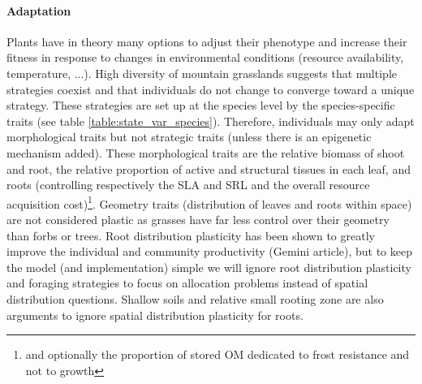 \paragraph{Adaptation} Plants have in theory many options to adjust their phenotype and increase their fitness in response to changes in environmental conditions (resource availability, temperature, ...). High diversity of mountain grasslands suggests that multiple strategies coexist and that individuals do not change to converge toward a unique strategy. These strategies are set up at the species level by the species-specific traits (see table \ref{table:state_var_species}). Therefore, individuals may only adapt morphological traits but not strategic traits (unless there is an epigenetic mechanism added). These morphological traits are the relative biomass of shoot and root, the relative proportion of active and structural tissues in each leaf, and roots (controlling respectively the SLA and SRL and the overall resource acquisition cost)\footnote{and optionally the proportion of stored OM dedicated to frost resistance and not to growth}. Geometry traits (distribution of leaves and roots within space) are not considered plastic as grasses have far less control over their geometry than forbs or trees. Root distribution plasticity has been shown to greatly improve the individual and community productivity (Gemini article), but to keep the model (and implementation) simple we will ignore root distribution plasticity and foraging strategies to focus on allocation problems instead of spatial distribution questions. Shallow soils and relative small rooting zone are also arguments to ignore spatial distribution plasticity for roots.


